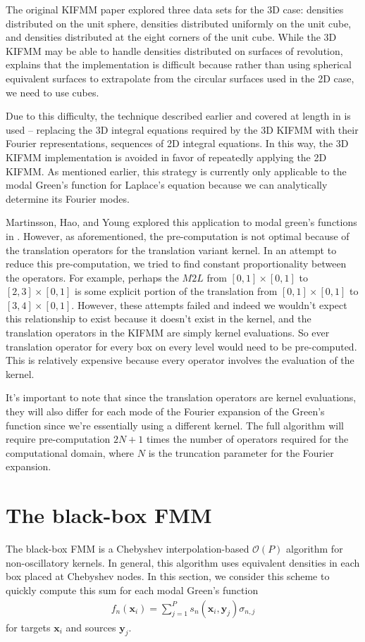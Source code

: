 \documentclass[11pt, oneside]{article}   	%
\begin{document}
The original KIFMM paper explored three data sets for the 3D case: densities distributed on the unit sphere, densities distributed uniformly on the unit cube, and densities distributed at the eight corners of the unit cube. While the 3D KIFMM may be able to handle densities distributed on surfaces of revolution, \cite{YBZ} explains that the implementation is difficult because rather than using spherical equivalent surfaces to extrapolate from the circular surfaces used in the 2D case, we need to use cubes.

Due to this difficulty, the technique described earlier and covered at length in \cite{YYM} is used -- replacing the 3D integral equations required by the 3D KIFMM with their Fourier representations, sequences of 2D integral equations. In this way, the 3D KIFMM implementation is avoided in favor of repeatedly applying the 2D KIFMM. As mentioned earlier, this strategy is currently only applicable to the modal Green's function for Laplace's equation because we can analytically determine its Fourier modes.

Martinsson, Hao, and Young explored this application to modal green's functions in \cite{YYM}. However, as aforementioned, the pre-computation is not optimal because of the translation operators for the translation variant kernel. In an attempt to reduce this pre-computation, we tried to find constant proportionality between the operators. For example, perhaps the $M2L$ from $[0,1]\times[0,1]$ to $[2,3]\times[0,1]$ is some explicit portion of the translation from $[0,1]\times[0,1]$ to $[3,4]\times[0,1]$. However, these attempts failed and indeed we wouldn't expect this relationship to exist because it doesn't exist in the kernel, and the translation operators in the KIFMM are simply kernel evaluations. So ever translation operator for every box on every level would need to be pre-computed. This is relatively expensive because every operator involves the evaluation of the kernel.

It's important to note that since the translation operators are kernel evaluations, they will also differ for each mode of the Fourier expansion of the Green's function since we're essentially using a different kernel. The full algorithm will require pre-computation $2N+1$ times the number of operators required for the computational domain, where $N$ is the truncation parameter for the Fourier expansion.

\section{The black-box FMM}
The black-box FMM is a Chebyshev interpolation-based $\mathcal{O}(P)$ algorithm for non-oscillatory kernels. In general, this algorithm uses equivalent densities in each box placed at Chebyshev nodes. In this section, we consider this scheme to quickly compute this sum for each modal Green's function
\begin{align}
f_n(\mathbf{x}_i)=\sum_{j=1}^P s_n(\mathbf{x}_i,\mathbf{y}_j)\sigma_{n,j}
\end{align}
for targets $\mathbf{x}_i$ and sources $\mathbf{y}_j$.
\end{document}
